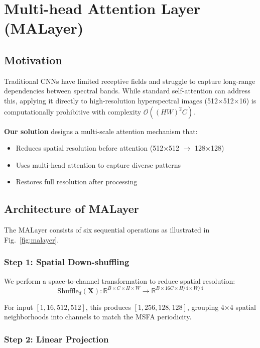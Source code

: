 \documentclass[conference]{IEEEtran}
\begin{document}
\section{Multi-head Attention Layer (MALayer)}

\subsection{Motivation}

Traditional CNNs have limited receptive fields and struggle to capture long-range dependencies between spectral bands. While standard self-attention can address this, applying it directly to high-resolution hyperspectral images (512×512×16) is computationally prohibitive with complexity $\mathcal{O}((HW)^2 C)$.

\textbf{Our solution} designs a multi-scale attention mechanism that:
\begin{itemize}
    \item Reduces spatial resolution before attention (512×512 $\rightarrow$ 128×128)
    \item Uses multi-head attention to capture diverse patterns
    \item Restores full resolution after processing
\end{itemize}

\subsection{Architecture of MALayer}

The MALayer consists of six sequential operations as illustrated in Fig.~\ref{fig:malayer}.

\subsubsection{Step 1: Spatial Down-shuffling}

We perform a space-to-channel transformation to reduce spatial resolution:
\begin{equation}
\text{Shuffle}_d(\mathbf{X}) : \mathbb{R}^{B \times C \times H \times W} \rightarrow \mathbb{R}^{B \times 16C \times H/4 \times W/4}
\end{equation}

For input $[1, 16, 512, 512]$, this produces $[1, 256, 128, 128]$, grouping 4×4 spatial neighborhoods into channels to match the MSFA periodicity.

\subsubsection{Step 2: Linear Projection}
\end{document}
